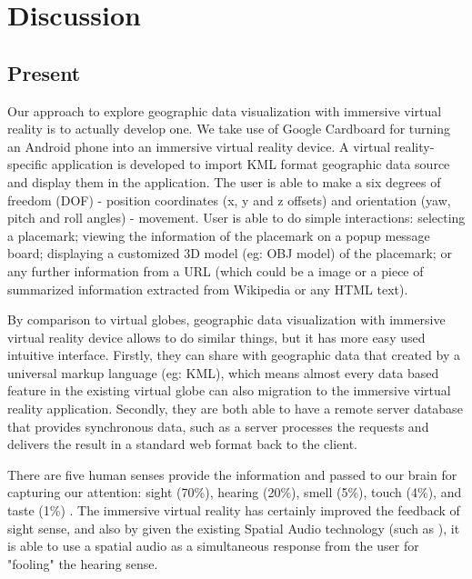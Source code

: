 \label{chapter-discussion}
\chapter{Discussion}

\section{Present}

Our approach to explore geographic data visualization with immersive virtual reality is to actually develop one. We take use of Google Cardboard for turning an Android phone into an immersive virtual reality device. A virtual reality-specific application is developed to import KML format geographic data source and display them in the application. The user is able to make a six degrees of freedom (DOF) - position coordinates (x, y and z offsets) and orientation (yaw, pitch and roll angles) - movement. User is able to do simple interactions: selecting a placemark; viewing the information of the placemark on a popup message board; displaying a customized 3D model (eg: OBJ model) of the placemark; or any further information from a URL (which could be a image or a piece of summarized information extracted from Wikipedia or any HTML text).

By comparison to virtual globes, geographic data visualization with immersive virtual reality device allows to do similar things, but it has more easy used intuitive interface. Firstly, they can share with geographic data that created by a universal markup language (eg: KML), which means almost every data based feature in the existing virtual globe can also migration to the immersive virtual reality application. Secondly, they are both able to have a remote server database that provides synchronous data, such as a server processes the requests and delivers the result in a standard web format back to the client. 

There are five human senses provide the information and passed to our brain for capturing our attention: sight (70\%), hearing (20\%), smell (5\%), touch (4\%), and taste (1\%) \parencite{mazuryk.vr.1996}. The immersive virtual reality has certainly improved the feedback of sight sense, and also by given the existing Spatial Audio technology (such as \parencite{google.spatial-audio.2016}), it is able to use a spatial audio as a simultaneous response from the user for "fooling" the hearing sense.

